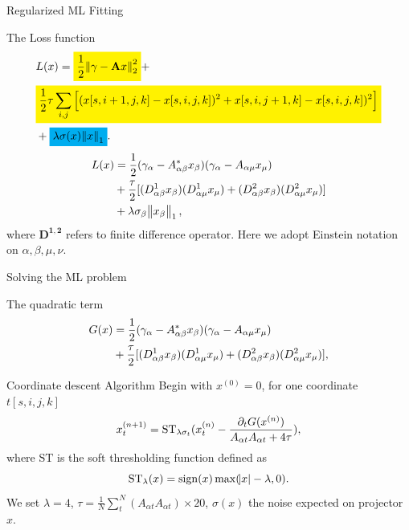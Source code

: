 \documentclass[10pt]{beamer}
\newcommand{\mathcolorbox}[2]{\colorbox{#1}{$\displaystyle #2$}}
\begin{document}
\begin{frame}{Regularized ML Fitting}
\begin{alertblock}{The Loss function}
\begin{equation}\notag
\begin{split}
&L(x) = \mathcolorbox{yellow}{\frac{1}{2} \norm{\gamma-\mathbf{A}x}^2_2} + \\
&\mathcolorbox{yellow}{\frac{1}{2}\tau \sum_{i,j}\left[(x[s,i+1,j,k]-x[s,i,j,k])^2+x[s,i,j+1,k]-x[s,i,j,k])^2\right]}\\
&+\mathcolorbox{cyan}{\lambda \sigma(x) \norm{x}_1}.
\end{split}
\end{equation}
\begin{equation}
\begin{split}
L(x)&=\frac{1}{2}(\gamma_{\alpha}-A^{*}_{\alpha\beta}x_{\beta})(\gamma_{\alpha}-A_{\alpha\mu}x_{\mu})\\
&+\frac{\tau}{2}[(D^{1}_{\alpha\beta} x_{\beta})(D^{1}_{\alpha\mu}x_{\mu})
+ (D^{2}_{\alpha\beta} x_{\beta})(D^{2}_{\alpha\mu}x_{\mu})] \\
&+ \lambda\sigma_\beta \norm{x_\beta}_1,
\end{split}
\end{equation}
where $\mathbf{D^{1,2}}$ refers to finite difference operator. Here we adopt Einstein notation on $\alpha, \beta, \mu, \nu$.
\end{alertblock}
\end{frame}

\begin{frame}{Solving the ML problem}
\begin{alertblock}{The quadratic term}
\begin{equation}\notag
\begin{split}
 G(x)&=\frac{1}{2}(\gamma_{\alpha}-A^{*}_{\alpha\beta}x_{\beta})(\gamma_{\alpha}-A_{\alpha\mu}x_{\mu})\\
&+\frac{\tau}{2}[(D^{1}_{\alpha\beta} x_{\beta})(D^{1}_{\alpha\mu}x_{\mu})
+ (D^{2}_{\alpha\beta} x_{\beta})(D^{2}_{\alpha\mu}x_{\mu})],
\end{split}
\end{equation}
\end{alertblock}
\begin{alertblock}{Coordinate descent Algorithm}
Begin with $x^{(0)}=0$, for one coordinate $t [s,i,j,k]$
\begin{equation}\notag
x^{(n+1)}_{t}=\mathrm{ST}_{\lambda\sigma_{t}} (x^{(n)}_{t} -\frac{\partial_t G(x^{(n)})}{A_{\alpha t}A_{\alpha t}+4\tau}),
\end{equation}
where $\mathrm{ST}$ is the soft thresholding function defined as
\begin{equation}\notag
\mathrm{ST}_{\lambda} (x) = \mathrm{sign} (x) \max (\abs{x}-\lambda,0).
\end{equation}
We set $\lambda=4$, $\tau= \frac{1}{N} \sum_t^N (A_{\alpha t}A_{\alpha t})\times 20$, $\sigma(x)$ the noise expected on projector
$x$.
\end{alertblock}
\end{frame}
\end{document}

